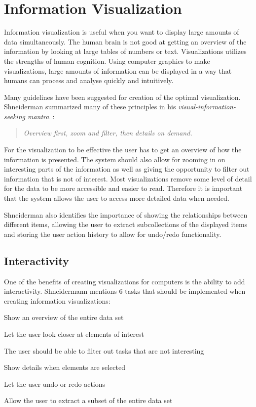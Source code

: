 \section{Information Visualization}
Information visualization is useful when you want to display large amounts of data simultaneously. The human brain is not good at getting an overview of the information by looking at large tables of numbers or text. Visualizations utilizes the strengths of human cognition. Using computer graphics to make visualizations, large amounts of information can be displayed in a way that humans can process and analyse quickly and intuitively.

Many guidelines have been suggested for creation of the optimal visualization. Shneiderman summarized many of these principles in his \emph{visual-information-seeking mantra}~\cite{shneiderman}:
\begin{quote}
\textit{Overview first, zoom and filter, then details on demand.}
\end{quote}

For the visualization to be effective the user has to get an overview of how the information is presented. The system should also allow for zooming in on interesting parts of the information as well as giving the opportunity to filter out information that is not of interest. Most visualizations remove some level of detail for the data to be more accessible and easier to read. Therefore it is important that the system allows the user to access more detailed data when needed.

Shneiderman also identifies the importance of showing the relationships between different items, allowing the user to extract subcollections of the displayed items and storing the user action history to allow for undo/redo functionality.

\subsection{Interactivity}
One of the benefits of creating visualizations for computers is the ability to add interactivity. Shneidermann mentions 6 tasks that should be implemented when creating information visualizations:
\vspace{-3mm}
\begin{description}[itemsep=0cm, parsep=0cm]
  \item[Overview] Show an overview of the entire data set
  \item[Zoom] Let the user look closer at elements of interest
  \item[Filter] The user should be able to filter out tasks that are not interesting
  \item[Details-on-demand] Show details when elements are selected
  \item[History] Let the user undo or redo actions
  \item[Extract] Allow the user to extract a subset of the entire data set
\end{description}

